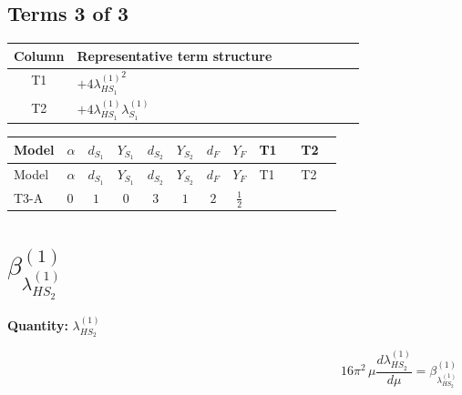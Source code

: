 \documentclass[8pt]{article}
\begin{document}
\begin{landscape}
\subsection*{Terms 3 of 3}
\begin{center}
\begin{tabular}{@{}c >{\raggedright\arraybackslash}p{0.82\linewidth}@{}}
\toprule
Column & Representative term structure \\
\midrule
T1 & \(\displaystyle +4 {\lambda_{HS_1}^{(1)}}^2\) \\
\midrule
T2 & \(\displaystyle +4 {\lambda_{HS_1}^{(1)}} {\lambda_{S_1}^{(1)}}\) \\
\midrule
\bottomrule
\end{tabular}
\end{center}
\smallskip
\tiny
\begin{longtable}{@{}llcccccc >{\raggedright\arraybackslash}p{0.21\linewidth} >{\raggedright\arraybackslash}p{0.21\linewidth}@{}}
\toprule
Model & $\alpha$ & $d_{S_1}$ & $Y_{S_1}$ & $d_{S_2}$ & $Y_{S_2}$ & $d_F$ & $Y_F$ & T1 & T2 \\
\midrule
\endfirsthead
\toprule
Model & $\alpha$ & $d_{S_1}$ & $Y_{S_1}$ & $d_{S_2}$ & $Y_{S_2}$ & $d_F$ & $Y_F$ & T1 & T2 \\
\midrule
\endhead
T3-A & $0$ & $1$ & $0$ & $3$ & $1$ & $2$ & $\frac{1}{2}$ & \scriptsize\adjustbox{max width=\linewidth}{$\begin{gathered} +4 {\lambda_{HS_1}^{(1)}}^2\end{gathered}$} & \scriptsize\adjustbox{max width=\linewidth}{$\begin{gathered} +4 {\lambda_{HS_1}^{(1)}} {\lambda_{S_1}^{(1)}}\end{gathered}$} \\
\midrule
\bottomrule
\end{longtable}
\clearpage
\section*{$\beta_{\lambda_{HS_2}^{(1)}}^{(1)}$}
\noindent\textbf{Quantity: }$\lambda_{HS_2}^{(1)}$\par\smallskip
\[16\pi^2\,\mu\frac{d \lambda_{HS_2}^{(1)}}{d\mu}=\beta_{\lambda_{HS_2}^{(1)}}^{(1)}\]

\end{landscape}
\end{document}
